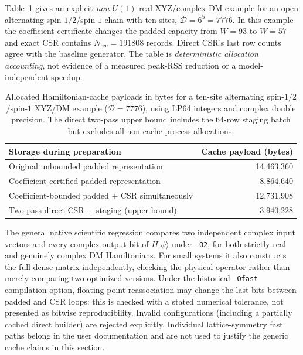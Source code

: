 \documentclass[preprint,12pt,nopreprintline]{elsarticle}
\begin{document}
Table~\ref{tab:general-csr-payload} gives an explicit
\emph{non-$U(1)$} real-XYZ/complex-DM example for an open
alternating spin-$1/2$/spin-$1$ chain with ten sites,
$\mathcal D=6^5=7776$. In this example the coefficient
certificate changes the padded capacity from $W=93$ to
$W=57$ and exact CSR contains $N_{\mathrm{rec}}=191808$
records. Direct CSR's last row counts agree with the
baseline generator. The table is \emph{deterministic allocation
accounting}, not evidence of a measured peak-RSS reduction or
a model-independent speedup.

\begin{table}[t]
\centering
\caption{Allocated Hamiltonian-cache payloads in bytes for a
ten-site alternating spin-$1/2$/spin-$1$ XYZ/DM example
($\mathcal D=7776$), using LP64 integers and complex double
precision. The direct two-pass upper bound includes the
64-row staging batch but excludes all non-cache process allocations.}
\label{tab:general-csr-payload}
\small
\begin{tabular}{lr}
\toprule
Storage during preparation & Cache payload (bytes)\\
\midrule
Original unbounded padded representation & 14,463,360\\
Coefficient-certified padded representation & 8,864,640\\
Coefficient-bounded padded + CSR simultaneously & 12,731,908\\
Two-pass direct CSR + staging (upper bound) & 3,940,228\\
\bottomrule
\end{tabular}
\end{table}

The general native scientific regression compares two independent
complex input vectors and every complex output bit of $H|\psi\rangle$
under \texttt{-O2}, for both strictly real and genuinely
complex DM Hamiltonians. For small systems it also constructs
the full dense matrix independently, checking the physical
operator rather than merely comparing two optimized versions.
Under the historical \texttt{-Ofast} compilation option,
floating-point reassociation may change the last bits between
padded and CSR loops: this is checked with a stated numerical
tolerance, not presented as bitwise reproducibility.
Invalid configurations (including a partially cached direct
builder) are rejected explicitly. Individual lattice-symmetry
fast paths belong in the user documentation and are not used
to justify the generic cache claims in this section.
\end{document}
